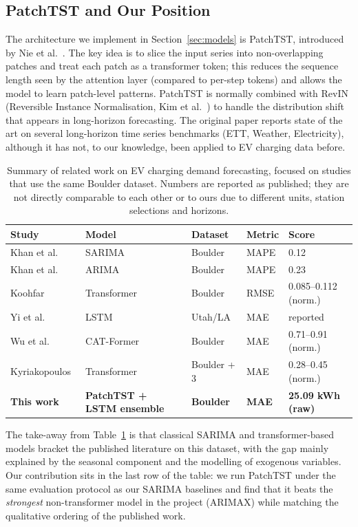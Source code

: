 \subsection{PatchTST and Our Position}

The architecture we implement in Section~\ref{sec:models} is
PatchTST, introduced by Nie et al.~\cite{nie2023patchtst}. The key
idea is to slice the input series into non-overlapping patches and
treat each patch as a transformer token; this reduces the sequence
length seen by the attention layer (compared to per-step tokens) and
allows the model to learn patch-level patterns. PatchTST is normally
combined with RevIN (Reversible Instance Normalisation,
Kim et al.~\cite{kim2022revin}) to handle the distribution shift that
appears in long-horizon forecasting. The original paper reports state
of the art on several long-horizon time series benchmarks (ETT,
Weather, Electricity), although it has not, to our knowledge, been
applied to EV charging data before.

\begin{table}[!htbp]
\centering
\caption{Summary of related work on EV charging demand forecasting,
focused on studies that use the same Boulder dataset. Numbers are
reported as published; they are not directly comparable to each other
or to ours due to different units, station selections and horizons.}
\label{tab:related}
\begin{tabular}{@{}lllll@{}}
\toprule
Study & Model & Dataset & Metric & Score \\
\midrule
Khan et al.~\cite{khan2024sarima}    & SARIMA          & Boulder & MAPE & 0.12 \\
Khan et al.~\cite{khan2024sarima}    & ARIMA           & Boulder & MAPE & 0.23 \\
Koohfar~\cite{koohfar2023transformer}& Transformer     & Boulder & RMSE & 0.085--0.112 (norm.) \\
Yi et al.~\cite{yi2022lstm}          & LSTM            & Utah/LA & MAE  & reported \\
Wu et al.~\cite{wu2025catformer}     & CAT-Former      & Boulder & MAE  & 0.71--0.91 (norm.) \\
Kyriakopoulos~\cite{kyriakopoulos2025comparative} & Transformer & Boulder + 3 & MAE & 0.28--0.45 (norm.) \\
\midrule
\textbf{This work} & \textbf{PatchTST + LSTM ensemble} & \textbf{Boulder} & \textbf{MAE} & \textbf{25.09 kWh (raw)} \\
\bottomrule
\end{tabular}
\end{table}

The take-away from Table~\ref{tab:related} is that classical SARIMA
and transformer-based models bracket the published literature on this
dataset, with the gap mainly explained by the seasonal component and
the modelling of exogenous variables. Our contribution sits in the
last row of the table: we run PatchTST under the same evaluation
protocol as our SARIMA baselines and find that it beats the
\emph{strongest} non-transformer model in the project (ARIMAX) while
matching the qualitative ordering of the published work.
